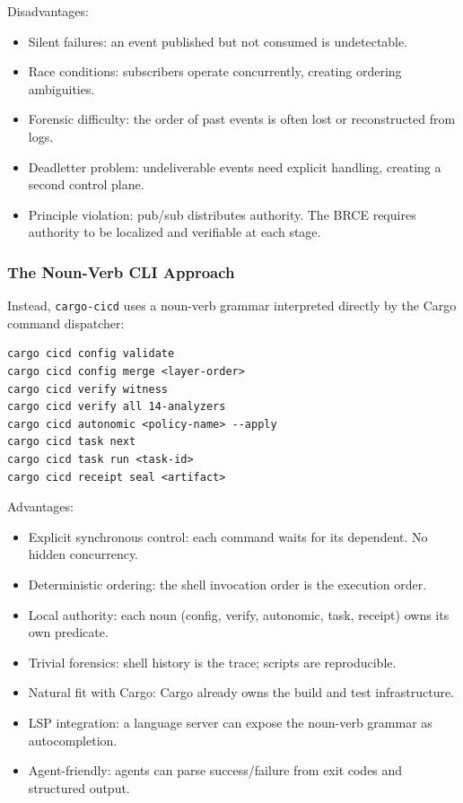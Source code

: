 Disadvantages:
\begin{itemize}
  \item Silent failures: an event published but not consumed is undetectable.
  \item Race conditions: subscribers operate concurrently, creating ordering ambiguities.
  \item Forensic difficulty: the order of past events is often lost or reconstructed from logs.
  \item Deadletter problem: undeliverable events need explicit handling, creating a second control plane.
  \item Principle violation: pub/sub distributes authority. The BRCE requires authority to be localized and verifiable at each stage.
\end{itemize}

\subsubsection{The Noun-Verb CLI Approach}

Instead, \texttt{cargo-cicd} uses a noun-verb grammar interpreted directly by the Cargo command dispatcher:

\begin{lstlisting}[caption={Noun-verb grammar for release operations}]
cargo cicd config validate
cargo cicd config merge <layer-order>
cargo cicd verify witness
cargo cicd verify all 14-analyzers
cargo cicd autonomic <policy-name> --apply
cargo cicd task next
cargo cicd task run <task-id>
cargo cicd receipt seal <artifact>
\end{lstlisting}

Advantages:
\begin{itemize}
  \item Explicit synchronous control: each command waits for its dependent. No hidden concurrency.
  \item Deterministic ordering: the shell invocation order is the execution order.
  \item Local authority: each noun (config, verify, autonomic, task, receipt) owns its own predicate.
  \item Trivial forensics: shell history is the trace; scripts are reproducible.
  \item Natural fit with Cargo: Cargo already owns the build and test infrastructure.
  \item LSP integration: a language server can expose the noun-verb grammar as autocompletion.
  \item Agent-friendly: agents can parse success/failure from exit codes and structured output.
\end{itemize}

